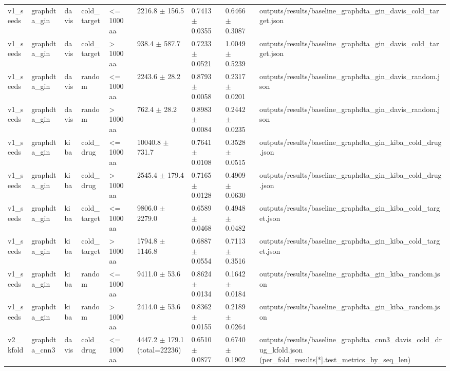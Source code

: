 \begin{table}[htbp]
\begin{tabular}{lllllllll}
v1\_seeds & graphdta\_gin & davis & cold\_target & <= 1000 aa & 2216.8 $\pm$ 156.5 & 0.7413 $\pm$ 0.0355 & 0.6466 $\pm$ 0.3087 & outputs/results/baseline\_graphdta\_gin\_davis\_cold\_target.json \\
v1\_seeds & graphdta\_gin & davis & cold\_target & > 1000 aa & 938.4 $\pm$ 587.7 & 0.7233 $\pm$ 0.0521 & 1.0049 $\pm$ 0.5239 & outputs/results/baseline\_graphdta\_gin\_davis\_cold\_target.json \\
v1\_seeds & graphdta\_gin & davis & random & <= 1000 aa & 2243.6 $\pm$ 28.2 & 0.8793 $\pm$ 0.0058 & 0.2317 $\pm$ 0.0201 & outputs/results/baseline\_graphdta\_gin\_davis\_random.json \\
v1\_seeds & graphdta\_gin & davis & random & > 1000 aa & 762.4 $\pm$ 28.2 & 0.8983 $\pm$ 0.0084 & 0.2442 $\pm$ 0.0235 & outputs/results/baseline\_graphdta\_gin\_davis\_random.json \\
v1\_seeds & graphdta\_gin & kiba & cold\_drug & <= 1000 aa & 10040.8 $\pm$ 731.7 & 0.7641 $\pm$ 0.0108 & 0.3528 $\pm$ 0.0515 & outputs/results/baseline\_graphdta\_gin\_kiba\_cold\_drug.json \\
v1\_seeds & graphdta\_gin & kiba & cold\_drug & > 1000 aa & 2545.4 $\pm$ 179.4 & 0.7165 $\pm$ 0.0128 & 0.4909 $\pm$ 0.0630 & outputs/results/baseline\_graphdta\_gin\_kiba\_cold\_drug.json \\
v1\_seeds & graphdta\_gin & kiba & cold\_target & <= 1000 aa & 9806.0 $\pm$ 2279.0 & 0.6589 $\pm$ 0.0468 & 0.4948 $\pm$ 0.0482 & outputs/results/baseline\_graphdta\_gin\_kiba\_cold\_target.json \\
v1\_seeds & graphdta\_gin & kiba & cold\_target & > 1000 aa & 1794.8 $\pm$ 1146.8 & 0.6887 $\pm$ 0.0554 & 0.7113 $\pm$ 0.3516 & outputs/results/baseline\_graphdta\_gin\_kiba\_cold\_target.json \\
v1\_seeds & graphdta\_gin & kiba & random & <= 1000 aa & 9411.0 $\pm$ 53.6 & 0.8624 $\pm$ 0.0134 & 0.1642 $\pm$ 0.0184 & outputs/results/baseline\_graphdta\_gin\_kiba\_random.json \\
v1\_seeds & graphdta\_gin & kiba & random & > 1000 aa & 2414.0 $\pm$ 53.6 & 0.8362 $\pm$ 0.0155 & 0.2189 $\pm$ 0.0264 & outputs/results/baseline\_graphdta\_gin\_kiba\_random.json \\
v2\_kfold & graphdta\_cnn3 & davis & cold\_drug & <= 1000 aa & 4447.2 $\pm$ 179.1 (total=22236) & 0.6510 $\pm$ 0.0877 & 0.6740 $\pm$ 0.1902 & outputs/results/baseline\_graphdta\_cnn3\_davis\_cold\_drug\_kfold.json (per\_fold\_results[*].test\_metrics\_by\_seq\_len) \\

\end{tabular}
\end{table}
